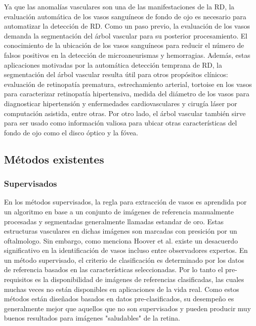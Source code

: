 Ya que las anomalías vasculares son una de las manifestaciones de la RD, la evaluación automática de los vasos sanguíneos de fondo de ojo es necesario para automatizar la detección de RD. Como un paso previo, la evaluación de los vasos demanda la segmentación del árbol vascular para su posterior procesamiento. El conocimiento de la ubicación de los vasos sanguíneos para reducir el número de falsos positivos en la detección de microaneurismas y hemorragias. Además, estas aplicaciones motivadas por la automática detección temprana de RD, la segmentación del árbol vascular resulta útil para otros propósitos clínicos: evaluación de retinopatía prematura, estrechamiento arterial, tortoise en los vasos para caracterizar retinopatía hipertensiva, medida del diámetro de los vasos para diagnosticar hipertensión y enfermedades cardiovasculares y cirugía láser por computación asistida, entre otras.
Por otro lado, el árbol vascular también sirve para ser usado como información valiosa para ubicar otras características del fondo de ojo como el disco óptico y la fóvea. \cite{marin2011new}

	\subsection{M\'etodos existentes}



	\subsubsection{Supervisados}

En los m\'etodos supervisados, la regla para extracci\'on de vasos es aprendida por un algoritmo en base a un conjunto de im\'agenes de referencia manualmente procesadas y segmentadas generalmente llamadas estandar de oro. Estas estructuras vasculares en dichas im\'agenes son marcadas con presici\'on por un oftalmologo. Sin embargo, como menciona Hoover et al. \cite{hoover2000locating} existe un desacuerdo significativo en la identificaci\'on de vasos incluso entre observadores expertos. En un m\'etodo supervisado, el criterio de clasificaci\'on es determinado por los datos de referencia basados en las caracter\'isticas seleccionadas. Por lo tanto el pre-requisitos es la disponibilidad de im\'agenes de referencias clasificadas, las cuales muchas veces no est\'an disponibles en aplicaciones de la vida real. Como estos m\'etodos est\'an dise\~nados basados en datos pre-clasificados, su desempeño es generalmente mejor que aquellos que no son supervisados y pueden producir muy buenos resultados para im\'agenes "saludables" de la retina.

